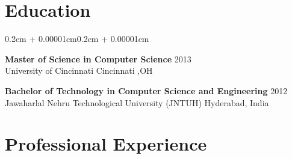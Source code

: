 \documentclass{article}
\newenvironment{onecolentry}{
    \begin{adjustwidth}{0.2cm + 0.00001cm}{0.2cm + 0.00001cm}
}{
    \end{adjustwidth}
}
\begin{document}
\section{Education}
\begin{onecolentry}
    \textbf{Master of Science in Computer Science} \hfill 2013 \\
    University of Cincinnati \hfill Cincinnati ,OH

    \vspace{0.2cm}

    \textbf{Bachelor of Technology in Computer Science and Engineering} \hfill 2012 \\
    Jawaharlal Nehru Technological University (JNTUH) \hfill Hyderabad, India
\end{onecolentry}

\section{Professional Experience}
\end{document}
